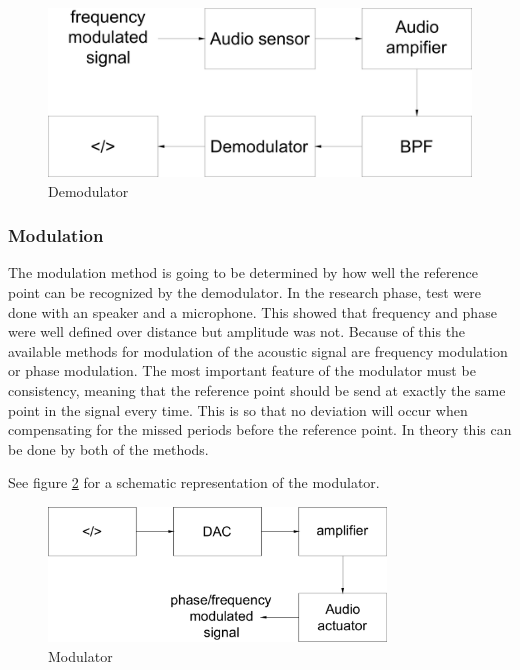 \documentclass[10pt,a4paper]{article}
\begin{document}
\begin{figure}[H]
  \centering
      \includegraphics[width=1\textwidth]{demodulator.pdf}
  \caption{Demodulator}
  \label{demodulator}
\end{figure}

\subsubsection{Modulation}
The modulation method is going to be determined by how well the reference point can be recognized by the demodulator. In the research phase, test were done with an speaker and a microphone. This showed that frequency and phase were well defined over distance but amplitude was not. Because of this the available methods for modulation of the acoustic signal are frequency modulation or phase modulation. The most important feature of the modulator must be consistency, meaning that the reference point should be send at exactly the same point in the signal every time. This is so that no deviation will occur when compensating for the missed periods before the reference point. In theory this can be done by both of the methods. 


See figure \ref{modulator} for a schematic representation of the modulator.

\begin{figure}[H]
  \centering
      \includegraphics[width=0.8\textwidth]{modulator.pdf}
  \caption{Modulator}
  \label{modulator}
\end{figure}
\end{document}
